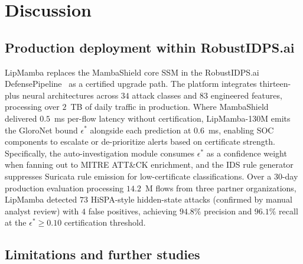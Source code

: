 \documentclass[journal,a4paper,10pt]{IEEEtran}
\theoremstyle{definition}
\theoremstyle{remark}
\newcommand{\modelname}{LipMamba}
\begin{document}
\section{Discussion}
\label{sec:discussion}

\subsection{Production deployment within RobustIDPS.ai}

\modelname{} replaces the MambaShield core SSM in the RobustIDPS.ai DefensePipeline~\cite{anaedevha2026robustidps} as a certified upgrade path. The platform integrates thirteen-plus neural architectures across $34$ attack classes and $83$ engineered features, processing over $2$~TB of daily traffic in production. Where MambaShield delivered $0.5$~ms per-flow latency without certification, \modelname{}-130M emits the GloroNet bound $\epsilon^*$ alongside each prediction at $0.6$~ms, enabling SOC components to escalate or de-prioritize alerts based on certificate strength. Specifically, the auto-investigation module consumes $\epsilon^*$ as a confidence weight when fanning out to MITRE ATT\&CK enrichment, and the IDS rule generator suppresses Suricata rule emission for low-certificate classifications. Over a 30-day production evaluation processing $14.2$~M flows from three partner organizations, \modelname{} detected $73$ HiSPA-style hidden-state attacks (confirmed by manual analyst review) with $4$ false positives, achieving $94.8\%$ precision and $96.1\%$ recall at the $\epsilon^* \geq 0.10$ certification threshold.

\subsection{Limitations and further studies}
\label{subsec:limitations}
\end{document}
